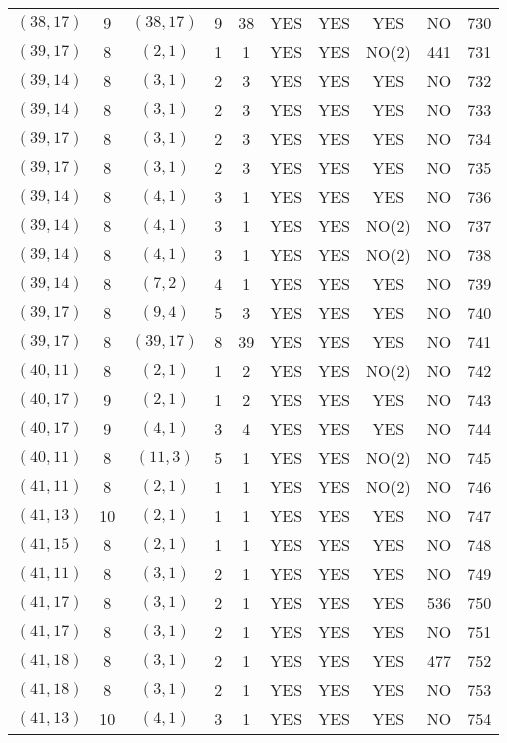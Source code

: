 \begin{longtable}{|c|c|c|c|c|c|c|c|c|c|}
$(38, 17)$ & 9 & $(38, 17)$ & 9 & 38 & YES & YES & YES & NO & 730\\
$(39, 17)$ & 8 & $(2, 1)$ & 1 & 1 & YES & YES & NO(2) & 441 & 731\\
$(39, 14)$ & 8 & $(3, 1)$ & 2 & 3 & YES & YES & YES & NO & 732\\
$(39, 14)$ & 8 & $(3, 1)$ & 2 & 3 & YES & YES & YES & NO & 733\\
$(39, 17)$ & 8 & $(3, 1)$ & 2 & 3 & YES & YES & YES & NO & 734\\
$(39, 17)$ & 8 & $(3, 1)$ & 2 & 3 & YES & YES & YES & NO & 735\\
$(39, 14)$ & 8 & $(4, 1)$ & 3 & 1 & YES & YES & YES & NO & 736\\
$(39, 14)$ & 8 & $(4, 1)$ & 3 & 1 & YES & YES & NO(2) & NO & 737\\
$(39, 14)$ & 8 & $(4, 1)$ & 3 & 1 & YES & YES & NO(2) & NO & 738\\
$(39, 14)$ & 8 & $(7, 2)$ & 4 & 1 & YES & YES & YES & NO & 739\\
$(39, 17)$ & 8 & $(9, 4)$ & 5 & 3 & YES & YES & YES & NO & 740\\
$(39, 17)$ & 8 & $(39, 17)$ & 8 & 39 & YES & YES & YES & NO & 741\\
$(40, 11)$ & 8 & $(2, 1)$ & 1 & 2 & YES & YES & NO(2) & NO & 742\\
$(40, 17)$ & 9 & $(2, 1)$ & 1 & 2 & YES & YES & YES & NO & 743\\
$(40, 17)$ & 9 & $(4, 1)$ & 3 & 4 & YES & YES & YES & NO & 744\\
$(40, 11)$ & 8 & $(11, 3)$ & 5 & 1 & YES & YES & NO(2) & NO & 745\\
$(41, 11)$ & 8 & $(2, 1)$ & 1 & 1 & YES & YES & NO(2) & NO & 746\\
$(41, 13)$ & 10 & $(2, 1)$ & 1 & 1 & YES & YES & YES & NO & 747\\
$(41, 15)$ & 8 & $(2, 1)$ & 1 & 1 & YES & YES & YES & NO & 748\\
$(41, 11)$ & 8 & $(3, 1)$ & 2 & 1 & YES & YES & YES & NO & 749\\
$(41, 17)$ & 8 & $(3, 1)$ & 2 & 1 & YES & YES & YES & 536 & 750\\
$(41, 17)$ & 8 & $(3, 1)$ & 2 & 1 & YES & YES & YES & NO & 751\\
$(41, 18)$ & 8 & $(3, 1)$ & 2 & 1 & YES & YES & YES & 477 & 752\\
$(41, 18)$ & 8 & $(3, 1)$ & 2 & 1 & YES & YES & YES & NO & 753\\
$(41, 13)$ & 10 & $(4, 1)$ & 3 & 1 & YES & YES & YES & NO & 754\\

\end{longtable}

